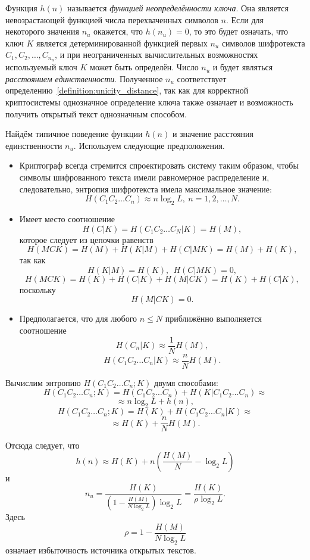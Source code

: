 Функция $h(n)$ называется \emph{функцией неопределённости ключа}. Она является невозрастающей функцией числа перехваченных символов $n$. Если для некоторого значения $n_u$ окажется, что $h ( n_u ) = 0$, то это будет означать, что ключ $K$ является детерминированной функцией первых $n_u$ символов шифротекста $C_1, C_2, \dots, C_{n_u}$, и при неограниченных вычислительных возможностях используемый ключ $K$ может быть определён. Число $n_u$ и будет являться \emph{расстоянием единственности}. Полученное $n_u$ соответствует определению~\ref{definition:unicity_distance}, так как для корректной криптосистемы однозначное определение ключа также означает и возможность получить открытый текст однозначным способом.

Найдём типичное поведение функции $h(n)$ и значение расстояния единственности $n_u$. Используем следующие предположения.
\begin{itemize}
    \item Криптограф всегда стремится спроектировать систему таким образом, чтобы символы шифрованного текста имели равномерное распределение и, следовательно, энтропия шифротекста имела максимальное значение:
            \[ H(C_1 C_2 \dots C_n) \approx n \log_2 L, ~ n = 1, 2, \dots, N. \]
    \item Имеет место соотношение
            \[ H(C | K) = H(C_1 C_2 \dots C_N | K)  =  H(M), \]
        которое следует из цепочки равенств
            \[ H(MCK) = H(M) + H(K | M) + H(C | MK) = H(M) + H(K), \]
        так как
            \[ H(K | M) = H(K), ~~ H(C | MK) = 0, \]
            \[H(MCK) = H(K) + H(C | K) + H(M | CK) = H(K) + H(C | K), \]
        поскольку
            \[ H(M | CK) = 0. \]
    \item Предполагается, что для любого $n \le N$ приближённо выполняется соотношение
        \[ H(C_n | K) \approx \frac{1}{N} H(M), \]
        \[ H(C_1 C_2\dots C_n | K) \approx \frac{n}{N} H(M). \]
\end{itemize}

Вычислим энтропию $H(C_1 C_2 \dots C_n ; K)$ двумя способами:
    \[ H( C_1 C_2 \dots C_n ; K ) = H(C_1 C_2 \dots C_n) + H(K | C_1 C_2 \dots C_n) \approx \]
        \[ \approx n \log_2 L + h(n), \]
    \[ H( C_1 C_2 \dots C_n ; K ) = H(K) + H(C_1 C_2 \dots C_n | K) \approx \]
        \[ \approx H(K) + \frac{n}{N} H(M). \]

Отсюда следует, что
    \[ h(n) \approx H(K) + n \left( \frac{H(M)}{N} - \log_2 L \right) \]
и
    \[ n_u = \frac{H(K)}{ \left( 1 - \frac{H(M)}{N \log_2 L} \right) \log_2 L} = \frac{H(K)}{\rho \log_2 L}. \]
Здесь
    \[ \rho = 1 - \frac{H(M)}{N \log_2 L} \]
означает избыточность источника открытых текстов.

